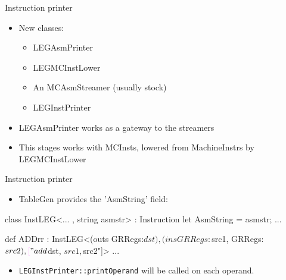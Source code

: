 

\begin{frame}{Instruction printer}

\begin{itemize}
    \item New classes:
    \begin{itemize}
        \item LEGAsmPrinter
        \item LEGMCInstLower
        \item An MCAsmStreamer (usually stock)
        \item LEGInstPrinter
    \end{itemize}
    \item LEGAsmPrinter works as a gateway to the streamers
    \item This stages works with MCInsts, lowered from MachineInstrs by LEGMCInstLower
\end{itemize}

\end{frame}


\begin{frame}[fragile]{Instruction printer}

\begin{itemize}
    \item TableGen provides the 'AsmString' field:
\end{itemize}

\begin{codebox}
class InstLEG<... , string asmstr> : Instruction {
  let AsmString = asmstr;
  ...
}
\end{codebox}

\begin{codebox}[commandchars=\\\[\]]
def ADDrr : InstLEG<(outs GRRegs:$dst),
                    (ins GRRegs:$src1, GRRegs:$src2),
                    \codeempha["add $dst, $src1, $src2"]> {
  ...
}
\end{codebox}

\begin{itemize}
    \item \texttt{LEGInstPrinter::printOperand} will be called on each operand.
\end{itemize}

\end{frame}

